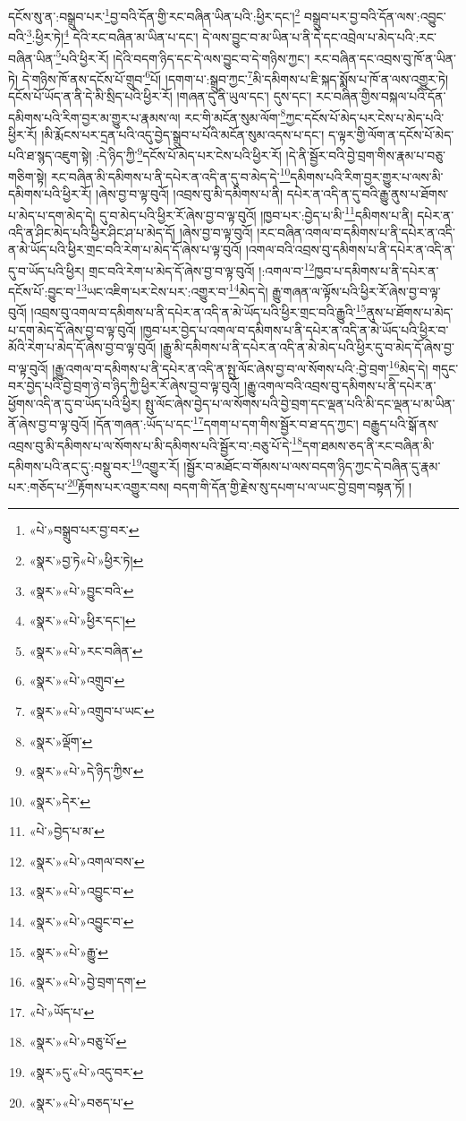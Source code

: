དངོས་སུ་ན་:བསྒྲུབ་པར་\footnote{«པེ་»བསྒྲུབ་པར་བྱ་བར་}བྱ་བའི་དོན་གྱི་རང་བཞིན་ཡིན་པའི་:ཕྱིར་དང་།\footnote{«སྣར་»བྱ་ཏེ«པེ་»ཕྱིར་ཏེ།} བསྒྲུབ་པར་བྱ་བའི་དོན་ལས་:འབྱུང་བའི་\footnote{«སྣར་»«པེ་»བྱུང་བའི་}:ཕྱིར་ཏེ།\footnote{«སྣར་»«པེ་»ཕྱིར་དང་།} དེའི་རང་བཞིན་མ་ཡིན་པ་དང་། དེ་ལས་བྱུང་བ་མ་ཡིན་པ་ནི་དེ་དང་འབྲེལ་པ་མེད་པའི་:རང་བཞིན་ཡིན་\footnote{«སྣར་»«པེ་»རང་བཞིན་}པའི་ཕྱིར་རོ། །དེའི་བདག་ཉིད་དང་དེ་ལས་བྱུང་བ་དེ་གཉིས་ཀྱང་། རང་བཞིན་དང་འབྲས་བུ་ཁོ་ན་ཡིན་ཏེ། དེ་གཉིས་ཁོ་ནས་དངོས་པོ་གྲུབ་\footnote{«སྣར་»«པེ་»འགྲུབ་}པོ། །དགག་པ་:སྒྲུབ་ཀྱང་\footnote{«སྣར་»«པེ་»འགྲུབ་པ་ཡང་}མི་དམིགས་པ་ཇི་སྐད་སྨོས་པ་ཁོ་ན་ལས་འགྱུར་ཏེ། དངོས་པོ་ཡོད་ན་ནི་དེ་མི་སྲིད་པའི་ཕྱིར་རོ། །གཞན་དུ་ནི་ཡུལ་དང་། དུས་དང་། རང་བཞིན་གྱིས་བསྐལ་པའི་དོན་དམིགས་པའི་རིག་བྱར་མ་གྱུར་པ་རྣམས་ལ། རང་གི་མངོན་སུམ་ལོག་\footnote{«སྣར་»ལྡོག་}ཀྱང་དངོས་པོ་མེད་པར་ངེས་པ་མེད་པའི་ཕྱིར་རོ། །མི་རྨོངས་པར་དྲན་པའི་འདུ་བྱེད་སྒྲུབ་པ་པོའི་མངོན་སུམ་འདས་པ་དང་། ད་ལྟར་གྱི་ལོག་ན་དངོས་པོ་མེད་པའི་ཐ་སྙད་འཇུག་སྟེ། :དེ་ཉིད་ཀྱི་\footnote{«སྣར་»«པེ་»དེ་ཉིད་ཀྱིས་}དངོས་པོ་མེད་པར་ངེས་པའི་ཕྱིར་རོ། །དེ་ནི་སྦྱོར་བའི་བྱེ་བྲག་གིས་རྣམ་པ་བཅུ་གཅིག་སྟེ། རང་བཞིན་མི་དམིགས་པ་ནི་དཔེར་ན་འདི་ན་དུ་བ་མེད་དེ་\footnote{«སྣར་»དེར་}དམིགས་པའི་རིག་བྱར་གྱུར་པ་ལས་མི་དམིགས་པའི་ཕྱིར་རོ། །ཞེས་བྱ་བ་ལྟ་བུའོ། །འབྲས་བུ་མི་དམིགས་པ་ནི། དཔེར་ན་འདི་ན་དུ་བའི་རྒྱུ་ནུས་པ་ཐོགས་པ་མེད་པ་དག་མེད་དེ། དུ་བ་མེད་པའི་ཕྱིར་རོ་ཞེས་བྱ་བ་ལྟ་བུའོ། །ཁྱབ་པར་:བྱེད་པ་མི་\footnote{«པེ་»བྱེད་པ་མ་}དམིགས་པ་ནི། དཔེར་ན་འདི་ན་ཤིང་མེད་པའི་ཕྱིར་ཤིང་ཤ་པ་མེད་དོ། །ཞེས་བྱ་བ་ལྟ་བུའོ། །རང་བཞིན་འགལ་བ་དམིགས་པ་ནི་དཔེར་ན་འདི་ན་མེ་ཡོད་པའི་ཕྱིར་གྲང་བའི་རེག་པ་མེད་དོ་ཞེས་པ་ལྟ་བུའོ། །འགལ་བའི་འབྲས་བུ་དམིགས་པ་ནི་དཔེར་ན་འདི་ན་དུ་བ་ཡོད་པའི་ཕྱིར། གྲང་བའི་རེག་པ་མེད་དོ་ཞེས་བྱ་བ་ལྟ་བུའོ། །:འགལ་བ་\footnote{«སྣར་»«པེ་»འགལ་བས་}ཁྱབ་པ་དམིགས་པ་ནི་དཔེར་ན་དངོས་པོ་:བྱུང་བ་\footnote{«སྣར་»«པེ་»འབྱུང་བ་}ཡང་འཇིག་པར་ངེས་པར་:འགྱུར་བ་\footnote{«སྣར་»«པེ་»འབྱུང་བ་}མེད་དེ། རྒྱུ་གཞན་ལ་ལྟོས་པའི་ཕྱིར་རོ་ཞེས་བྱ་བ་ལྟ་བུའོ། །འབྲས་བུ་འགལ་བ་དམིགས་པ་ནི་དཔེར་ན་འདི་ན་མེ་ཡོད་པའི་ཕྱིར་གྲང་བའི་རྒྱུའི་\footnote{«སྣར་»«པེ་»རྒྱུ་}ནུས་པ་ཐོགས་པ་མེད་པ་དག་མེད་དོ་ཞེས་བྱ་བ་ལྟ་བུའོ། །ཁྱབ་པར་བྱེད་པ་འགལ་བ་དམིགས་པ་ནི་དཔེར་ན་འདི་ན་མེ་ཡོད་པའི་ཕྱིར་བ་མོའི་རེག་པ་མེད་དོ་ཞེས་བྱ་བ་ལྟ་བུའོ། །རྒྱུ་མི་དམིགས་པ་ནི་དཔེར་ན་འདི་ན་མེ་མེད་པའི་ཕྱིར་དུ་བ་མེད་དོ་ཞེས་བྱ་བ་ལྟ་བུའོ། །རྒྱུ་འགལ་བ་དམིགས་པ་ནི་དཔེར་ན་འདི་ན་སྤུ་ལོང་ཞེས་བྱ་བ་ལ་སོགས་པའི་:བྱེ་བྲག་\footnote{«སྣར་»«པེ་»བྱེ་བྲག་དག་}མེད་དེ། གདུང་བར་བྱེད་པའི་བྱེ་བྲག་ཉེ་བ་ཉིད་ཀྱི་ཕྱིར་རོ་ཞེས་བྱ་བ་ལྟ་བུའོ། །རྒྱུ་འགལ་བའི་འབྲས་བུ་དམིགས་པ་ནི་དཔེར་ན་ཕྱོགས་འདི་ན་དུ་བ་ཡོད་པའི་ཕྱིར། སྤུ་ལོང་ཞེས་བྱེད་པ་ལ་སོགས་པའི་བྱེ་བྲག་དང་ལྡན་པའི་མི་དང་ལྡན་པ་མ་ཡིན་ནོ་ཞེས་བྱ་བ་ལྟ་བུའོ། །དོན་གཞན་:ཡོད་པ་དང་\footnote{«པེ་»ཡོད་པ་}དགག་པ་དག་གིས་སྦྱོར་བ་ཐ་དད་ཀྱང་། བརྒྱུད་པའི་སྒོ་ནས་འབྲས་བུ་མི་དམིགས་པ་ལ་སོགས་པ་མི་དམིགས་པའི་སྦྱོར་བ་:བཅུ་པོ་དེ་\footnote{«སྣར་»«པེ་»བཅུ་པོ་}དག་ཐམས་ཅད་ནི་རང་བཞིན་མི་དམིགས་པའི་ནང་དུ་:བསྡུ་བར་\footnote{«སྣར་»དུ་«པེ་»འདུ་བར་}འགྱུར་རོ། །སྦྱོར་བ་མཐོང་བ་གོམས་པ་ལས་བདག་ཉིད་ཀྱང་དེ་བཞིན་དུ་རྣམ་པར་:གཅོད་པ་\footnote{«སྣར་»«པེ་»བཅད་པ་}རྟོགས་པར་འགྱུར་བས། བདག་གི་དོན་གྱི་རྗེས་སུ་དཔག་པ་ལ་ཡང་བྱེ་བྲག་བསྟན་ཏོ། །
